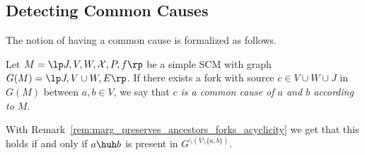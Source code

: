 \subsection{Detecting Common Causes}

The notion of having a common cause is formalized as follows.
\begin{Def}
  Let $M = \lt \Sin, \Send, \Srnd, \CX, P, f \rt$ be a simple SCM with graph $G(M) = \lt J, V \cup W, E \rt$.
    If there exists a fork with source $c \in V \cup W \cup J$ in $G(M)$ between $a,b \in V$, we say that \emph{$c$ is a common cause of $a$ and $b$ according to $M$}.
\end{Def}
With Remark~\ref{rem:marg_preserves_ancestors_forks_acyclicity} we get that this holds if and only if $a \huh b$ is present in $G^{\setminus (V\setminus\{a,b\})}$.

